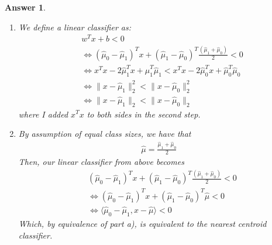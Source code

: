 \documentclass[12pt]{article}
\theoremstyle{colon}
\newtheorem*{answer}{Answer}
\begin{document}
\begin{answer}
  \

  \begin{enumerate}[label=\alph*)]
    \item We define a linear classifier as:
      \begin{align*}
        &w^T x + b < 0 \\
        &\Longleftrightarrow (\hat{\mu}_0 - \hat{\mu}_1)^T x + (\hat{\mu}_1 - \hat{\mu}_0)^T \frac{(\hat{\mu}_1 + \hat{\mu}_0)}{2} < 0 \\
        &\Longleftrightarrow x^T x - 2 \hat{\mu}_1^T x + \hat{\mu}_1^T \hat{\mu}_1 < x^T x - 2 \hat{\mu}_0^T x + \hat{\mu}_0^T \hat{\mu}_0 \\
        &\Longleftrightarrow \lVert x - \hat{\mu}_1 \rVert_2^2 < \lVert x - \hat{\mu}_0 \rVert_2^2 \\
        &\Longleftrightarrow \lVert x - \hat{\mu}_1 \rVert_2 < \lVert x - \hat{\mu}_0 \rVert_2
      \end{align*}
      where I added $x^T x$ to both sides in the second step.

    \item By assumption of equal class sizes, we have that
      \begin{gather*}
        \hat{\mu} = \frac{\hat{\mu}_1 + \hat{\mu}_0}{2}
      \end{gather*}
      Then, our linear classifier from above becomes
      \begin{align*}
        & (\hat{\mu}_0 - \hat{\mu}_1)^T x + (\hat{\mu}_1 - \hat{\mu}_0)^T \frac{(\hat{\mu}_1 + \hat{\mu}_0)}{2} < 0 \\
        &\Longleftrightarrow (\hat{\mu}_0 - \hat{\mu}_1)^T x + (\hat{\mu}_1 - \hat{\mu}_0)^T \hat{\mu} < 0 \\
        &\Longleftrightarrow \langle \hat{\mu}_0 - \hat{\mu}_1, x - \hat{\mu} \rangle < 0
      \end{align*}
      Which, by equivalence of part a), is equivalent to the nearest centroid classifier.


\end{enumerate}
\end{answer}
\end{document}
